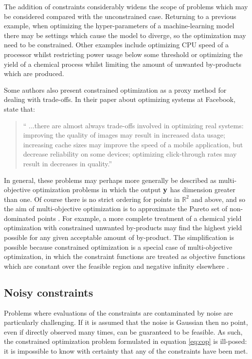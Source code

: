 The addition of constraints considerably widens the scope of problems which may be considered compared with the unconstrained case. Returning to a previous example, when optimizing the hyper-parameters of a machine-learning model there may be settings which cause the model to diverge, so the optimization may need to be constrained. Other examples include optimizing CPU speed of a processor whilst restricting power usage below some threshold or optimizing the yield of a chemical process whilst limiting the amount of unwanted by-products which are produced. 

Some authors \cite{gardner2014bayesian} \cite{letham2017constrained} also present constrained optimization as a proxy method for dealing with trade-offs. In their paper about optimizing systems at Facebook, \citet{letham2017constrained} state that:
%
\begin{quotation}
`` ...there are almost always trade-offs involved in optimizing real systems: improving the quality of images may result in increased data usage; increasing cache sizes may improve the speed of a mobile application, but decrease reliability on some devices; optimizing click-through rates may result in decreases in quality.''
\end{quotation}
%
In general, these problems may perhaps more generally be described as multi-objective optimization problems in which the output $\mathbf{y}$ has dimension greater than one. Of course there is no strict ordering for points in $\mathbb{R}^2$ and above, and so the aim of multi-objective optimization is to approximate the Pareto set of non-dominated points \cite{dt3}. For example, a more complete treatment of a chemical yield optimization with constrained unwanted by-products may find the highest yield possible for any given acceptable amount of by-product. The simplification is possible because constrained optimization is a special case of  multi-objective optimization, in which the constraint functions are treated as objective functions which are constant over the feasible region and negative infinity elsewhere \cite{gelbart}.  

\subsection{Noisy constraints} \label{sec:nconst}

Problems where evaluations of the constraints are contaminated by noise are particularly challenging. If it is assumed that the noise is Gaussian then no point, even if directly observed many times, can be guaranteed to be feasible. As such, the constrained optimization problem formulated in equation \ref{eq:cop} is ill-posed: it is impossible to know with certainty that any of the constraints have been met. 

